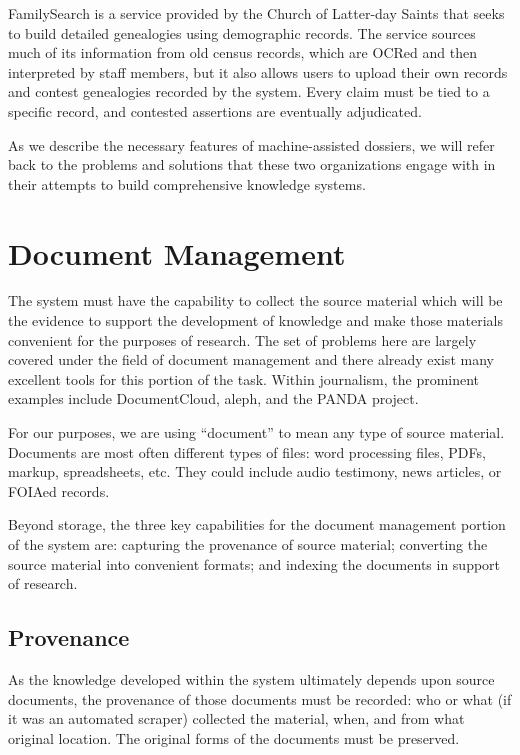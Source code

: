 \documentclass[format=siggraph, review=true]{acmart}
\begin{document}
FamilySearch is a service provided by the Church of Latter-day Saints
that seeks to build detailed genealogies using demographic
records.\cite{familysearch} The service sources much of its
information from old census records, which are OCRed and then
interpreted by staff members, but it also allows users to upload their
own records and contest genealogies recorded by the system. Every
claim must be tied to a specific record, and contested assertions are
eventually adjudicated.

As we describe the necessary features of machine-assisted dossiers, we will
refer back to the problems and solutions that these two organizations
engage with in their attempts to build comprehensive knowledge systems.

\section{Document Management}
The system must have the capability to collect the source material
which will be the evidence to support the development of
knowledge and make those materials convenient for the purposes of
research. The set of problems here are largely covered under the field
of document management and there already exist many excellent tools
for this portion of the task. Within journalism, the prominent
examples include DocumentCloud, aleph, and the PANDA
project.\cite{documentcloud, aleph, panda}

For our purposes, we are using ``document'' to mean any type of source
material. Documents are most often different types of files: word
processing files, PDFs, markup, spreadsheets, etc. They could
include audio testimony, news articles, or FOIAed records.

Beyond storage, the three key capabilities for the document management
portion of the system are: capturing the provenance of source material;
converting the source material into convenient formats; and indexing
the documents in support of research.

\subsection{Provenance}
As the knowledge developed within the system ultimately depends upon
source documents, the provenance of those documents must be
recorded: who or what (if it was an automated scraper) collected the
material, when, and from what original location. The original forms of the
documents must be preserved.
\end{document}
